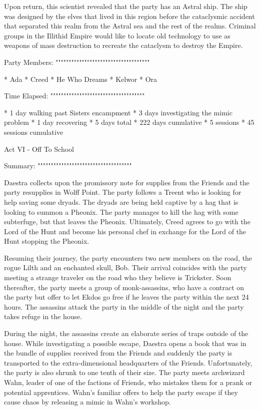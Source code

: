 Upon return, this scientist revealed that the party has an Astral ship.
The ship was designed by the elves that lived in this region before the cataclysmic accident that separated this realm from the Astral sea and the rest of the realms.
Criminal groups in the Illithid Empire would like to locate old technology to use as weapons of mass destruction to recreate the cataclysm to destroy the Empire.

Party Members:
""""""""""""""""""""""""""""""""""""

  * Ada
  * Creed
  * He Who Dreams
  * Kelwor
  * Ora

Time Elapsed:
""""""""""""""""""""""""""""""""""""

  * 1 day walking past Sisters encampment
  * 3 days investigating the mimic problem
  * 1 day recovering
  * 5 days total
  * 222 days cumulative
  * 5 sessions
  * 45 sessions cumulative

Act VI - Off To School
^^^^^^^^^^^^^^^^^^^^^^^^^^^^^^^^^^^^

Summary:
""""""""""""""""""""""""""""""""""""

Daestra collects upon the promissory note for supplies from the Friends and the party resupplies in Wolff Point.
The party follows a Treent who is looking for help saving some dryads.
The dryads are being held captive by a hag that is looking to summon a Pheonix.
The party manages to kill the hag with some subterfuge, but that leaves the Pheonix.
Ultimately, Creed agrees to go with the Lord of the Hunt and become his personal chef in exchange for the Lord of the Hunt stopping the Pheonix.

Resuming their journey, the party encounters two new members on the road, the rogue Lilth and an enchanted skull, Bob.
Their arrival coincides with the party meeting a strange traveler on the road who they believe is Trickster.
Soon thereafter, the party meets a group of monk-assassins, who have a contract on the party but offer to let Ekdos go free if he leaves the party within the next 24 hours.
The assassins attack the party in the middle of the night and the party takes refuge in the house.

During the night, the assassins create an elaborate series of traps outside of the house.
While investigating a possible escape, Daestra opens a book that was in the bundle of supplies received from the Friends and suddenly the party is transported to the extra-dimensional headquarters of the Friends.
Unfortunately, the party is also shrunk to one tenth of their size.
The party meets archwizard Wahn, leader of one of the factions of Friends, who mistakes them for a prank or potential apprentices.
Wahn's familiar offers to help the party escape if they cause chaos by releasing a mimic in Wahn's workshop.

